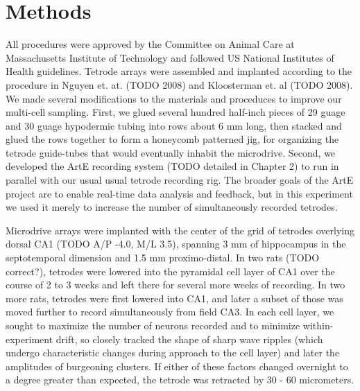 \documentclass[10pt]{article}
\begin{document}
\section*{Methods}
All procedures were approved by the Committee on Animal Care at Massachusetts Institute of Technology and followed US National Institutes of Health guidelines. Tetrode arrays were assembled and implanted  according to the procedure in Nguyen et. at. (TODO 2008) and Kloosterman et. al (TODO 2008). We made several modifications to the materials and proceduces to improve our multi-cell sampling.  First, we glued several hundred half-inch pieces of 29 guage and 30 guage hypodermic tubing into rows about 6 mm long, then stacked and glued the rows together to form a honeycomb patterned jig, for organizing the tetrode guide-tubes that would eventually inhabit the microdrive. Second, we developed the ArtE recording system (TODO detailed in Chapter 2) to run in parallel with our usual usual tetrode recording rig. The broader goals of the ArtE project are to enable real-time data analysis and feedback, but in this experiment we used it merely to increase the number of simultaneously recorded tetrodes.

Microdrive arrays were implanted with the center of the grid of tetrodes overlying dorsal CA1 (TODO A/P -4.0, M/L 3.5), spanning 3 mm of hippocampus in the septotemporal dimension and 1.5 mm proximo-distal. In two rats (TODO correct?), tetrodes were lowered into the pyramidal cell layer of CA1 over the course of 2 to 3 weeks and left there for several more weeks of recording.  In two more rats, tetrodes were first lowered into CA1, and later a subset of those was moved further to record simultaneously from field CA3. In each cell layer, we sought to maximize the number of neurons recorded and to minimize within-experiment drift, so closely tracked the shape of sharp wave ripples (which undergo characteristic changes during approach to the cell layer) and later the amplitudes of burgeoning clusters. If either of these factors changed overnight to a degree greater than expected, the tetrode was retracted by 30 - 60 micrometers.
\end{document}

